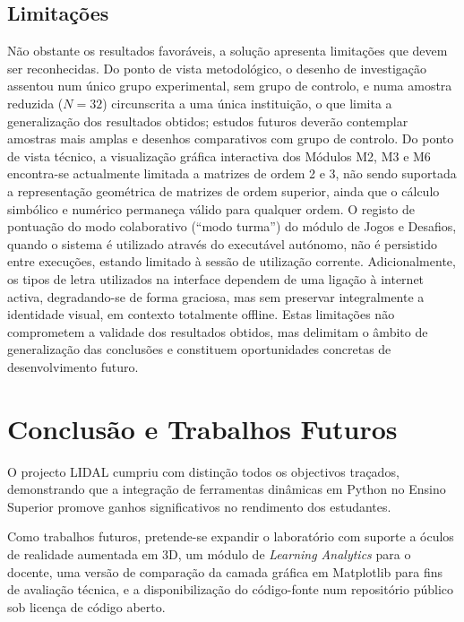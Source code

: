 \documentclass[conference]{IEEEtran}
\begin{document}
\subsection{Limitações}

Não obstante os resultados favoráveis, a solução apresenta limitações que devem ser reconhecidas. Do ponto de vista metodológico, o desenho de investigação assentou num único grupo experimental, sem grupo de controlo, e numa amostra reduzida ($N=32$) circunscrita a uma única instituição, o que limita a generalização dos resultados obtidos; estudos futuros deverão contemplar amostras mais amplas e desenhos comparativos com grupo de controlo. Do ponto de vista técnico, a visualização gráfica interactiva dos Módulos M2, M3 e M6 encontra-se actualmente limitada a matrizes de ordem 2 e 3, não sendo suportada a representação geométrica de matrizes de ordem superior, ainda que o cálculo simbólico e numérico permaneça válido para qualquer ordem. O registo de pontuação do modo colaborativo (``modo turma'') do módulo de Jogos e Desafios, quando o sistema é utilizado através do executável autónomo, não é persistido entre execuções, estando limitado à sessão de utilização corrente. Adicionalmente, os tipos de letra utilizados na interface dependem de uma ligação à internet activa, degradando-se de forma graciosa, mas sem preservar integralmente a identidade visual, em contexto totalmente offline. Estas limitações não comprometem a validade dos resultados obtidos, mas delimitam o âmbito de generalização das conclusões e constituem oportunidades concretas de desenvolvimento futuro.

\section{Conclusão e Trabalhos Futuros}
\label{sec:conclusao}

O projecto LIDAL cumpriu com distinção todos os objectivos traçados, demonstrando que a integração de ferramentas dinâmicas em Python no Ensino Superior promove ganhos significativos no rendimento dos estudantes.

Como trabalhos futuros, pretende-se expandir o laboratório com suporte a óculos de realidade aumentada em 3D, um módulo de \textit{Learning Analytics} para o docente, uma versão de comparação da camada gráfica em Matplotlib para fins de avaliação técnica, e a disponibilização do código-fonte num repositório público sob licença de código aberto.

\nocite{gladcheff2001,oliveira2001,bardin2016}


\end{document}
